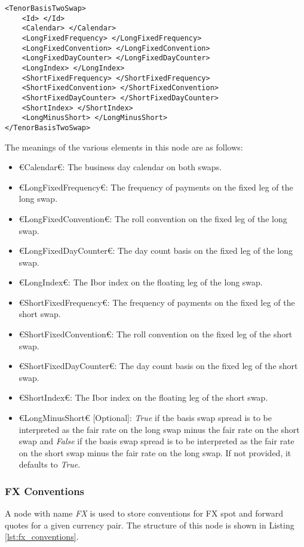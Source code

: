 \begin{lstlisting}[caption={Tenor basis two swap conventions}, label=lst:tenor_basis_two_conventions]
<TenorBasisTwoSwap>
	<Id> </Id>
	<Calendar> </Calendar>
	<LongFixedFrequency> </LongFixedFrequency>
	<LongFixedConvention> </LongFixedConvention>
	<LongFixedDayCounter> </LongFixedDayCounter>
	<LongIndex> </LongIndex>
	<ShortFixedFrequency> </ShortFixedFrequency>
	<ShortFixedConvention> </ShortFixedConvention>
	<ShortFixedDayCounter> </ShortFixedDayCounter>
	<ShortIndex> </ShortIndex>
	<LongMinusShort> </LongMinusShort>
</TenorBasisTwoSwap>
\end{lstlisting}

The meanings of the various elements in this node are as follows:
\begin{itemize}
\item €Calendar€: The business day calendar on both swaps.
\item €LongFixedFrequency€: The frequency of payments on the fixed leg of the long swap.
\item €LongFixedConvention€: The roll convention on the fixed leg of the long swap.
\item €LongFixedDayCounter€: The day count basis on the fixed leg of the long swap.
\item €LongIndex€: The Ibor index on the floating leg of the long swap.
\item €ShortFixedFrequency€: The frequency of payments on the fixed leg of the short swap.
\item €ShortFixedConvention€: The roll convention on the fixed leg of the short swap.
\item €ShortFixedDayCounter€: The day count basis on the fixed leg of the short swap.
\item €ShortIndex€: The Ibor index on the floating leg of the short swap.
\item €LongMinusShort€ [Optional]: \emph{True} if the basis swap spread is to be interpreted as the fair rate on the long 
swap minus the fair rate on the short swap and \emph{False} if the basis swap spread is to be interpreted as the fair rate 
on the short swap minus the fair rate on the long swap. If not provided, it defaults to \emph{True}.
\end{itemize}

\subsubsection{FX Conventions}
A node with name \emph{FX} is used to store conventions for FX spot and forward quotes for a given currency pair. The 
structure of this node is shown in Listing \ref{lst:fx_conventions}.

